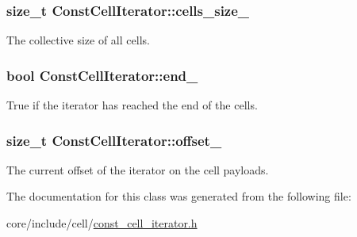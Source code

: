 \subsubsection[{cells\+\_\+size\+\_\+}]{\setlength{\rightskip}{0pt plus 5cm}size\+\_\+t Const\+Cell\+Iterator\+::cells\+\_\+size\+\_\+\hspace{0.3cm}{\ttfamily [private]}}\label{classConstCellIterator_a0690017c4778d17a5b61ae0215867dfb}
The collective size of all cells. \hypertarget{classConstCellIterator_a47ba693ca9b601e97b259a2662f09e90}{}
\subsubsection[{end\+\_\+}]{\setlength{\rightskip}{0pt plus 5cm}bool Const\+Cell\+Iterator\+::end\+\_\+\hspace{0.3cm}{\ttfamily [private]}}\label{classConstCellIterator_a47ba693ca9b601e97b259a2662f09e90}
True if the iterator has reached the end of the cells. \hypertarget{classConstCellIterator_a7eeda84048da7b521b00e315b8853665}{}
\subsubsection[{offset\+\_\+}]{\setlength{\rightskip}{0pt plus 5cm}size\+\_\+t Const\+Cell\+Iterator\+::offset\+\_\+\hspace{0.3cm}{\ttfamily [private]}}\label{classConstCellIterator_a7eeda84048da7b521b00e315b8853665}
The current offset of the iterator on the cell payloads. 

The documentation for this class was generated from the following file\+:\begin{DoxyCompactItemize}
\item 
core/include/cell/\hyperlink{const__cell__iterator_8h}{const\+\_\+cell\+\_\+iterator.\+h}\end{DoxyCompactItemize}
